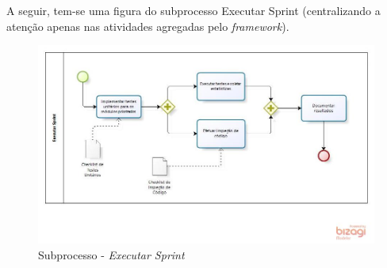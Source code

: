 A seguir, tem-se uma figura do subprocesso Executar Sprint (centralizando a atenção apenas nas atividades agregadas pelo \textit{framework}).

\begin{figure}[h]
\includegraphics[width=\textwidth]{figuras/executarsprint.jpg}
\caption{Subprocesso - \textit{Executar Sprint}}
\end{figure}